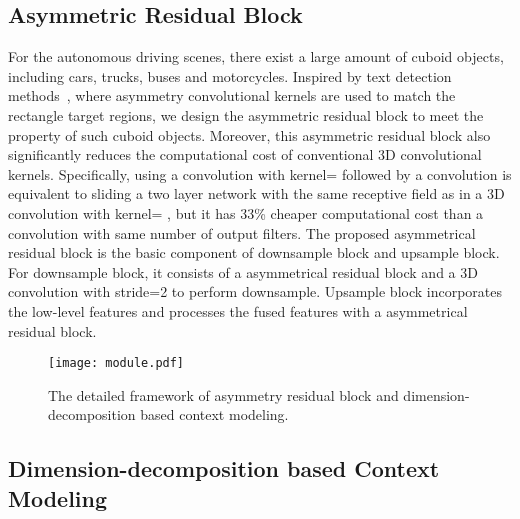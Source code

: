 \documentclass{article}
\begin{document}
\subsection{Asymmetric Residual Block}



For the autonomous driving scenes, there exist a large amount of cuboid objects, including cars, trucks, buses and motorcycles. Inspired by text detection methods~\cite{wang2019shape}, where asymmetry convolutional kernels are used to match the rectangle target regions, we design the asymmetric residual block to meet the property of such cuboid objects. Moreover, this asymmetric residual block also significantly reduces the computational cost of conventional 3D convolutional kernels.
Specifically, using a convolution with kernel= followed by a  convolution is equivalent to sliding a two layer network with the same receptive field as in a 3D convolution with kernel= , but it has 33\% cheaper computational cost than a  convolution with same number of output filters. The proposed asymmetrical residual block is the basic component of downsample block and upsample block. For downsample block, it consists of a asymmetrical residual block and a 3D convolution with stride=2 to perform downsample. Upsample block incorporates the low-level features and processes the fused features with a asymmetrical residual block.



    \begin{figure*}
    \centering
    \texttt{[image: module.pdf]}
    \caption{The detailed framework of asymmetry residual block and dimension-decomposition based context modeling.}
    \label{fig:modules}
    \end{figure*}

\subsection{Dimension-decomposition based Context Modeling}
\end{document}
